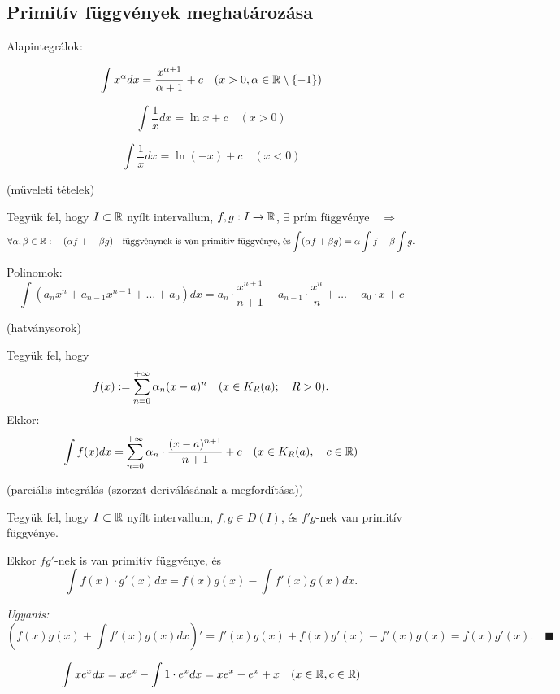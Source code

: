 \documentclass[a4paper,11.5pt]{article}
\begin{document}
	\subsection{Primitív függvények meghatározása}
	Alapintegrálok:
	\begin{example}
		\[ \int x^\alpha dx=\frac{x^{\alpha+1}}{\alpha+1}+c\quad (x>0, \alpha\in\mathbb{R}\setminus\{-1\}) \]
	\end{example}
	\begin{example}
		\[ \int \frac{1}{x} dx=\ln x +c\quad (x>0) \]
	\end{example}
	\begin{example}
		\[ \int \frac{1}{x} dx=\ln (-x) +c\quad (x<0) \]
	\end{example}
	\begin{theorem}
		(műveleti tételek)
		
		Tegyük fel, hogy $I\subset\mathbb{R}$ nyílt intervallum, $f,g:I\to\mathbb{R}$, $\exists$ prím függvénye$\quad \Rightarrow\quad$
		\[ \forall\alpha,\beta\in\mathbb{R}:\quad (\alpha f +\quad \beta g)\quad \text{függvénynek is van primitív függvénye, és}  \int(\alpha f +\beta g)=\alpha\int f+\beta \int g. \]
	\end{theorem}
	\begin{example}
		Polinomok:
		\[ \int(a_nx^n+a_{n-1}x^{n-1}+\ldots+a_0)dx=a_n\cdot
		\frac{x^{n+1}}{n+1}+a_{n-1}\cdot\frac{x^n}{n}+\ldots+a_0\cdot x+c \]
	\end{example}
	\begin{theorem}
		(hatványsorok)
		
		Tegyük fel, hogy 
		\[ f(x):=\displaystyle\sum_{n=0}^{+\infty}\alpha_n(x-a)^n\quad (x\in K_R(a);\quad R>0). \]
		Ekkor:
		\[ \int f(x)dx = \displaystyle\sum_{n=0}^{+\infty} \alpha_n\cdot\frac{(x-a)^{n+1}}{n+1}+c\quad (x\in K_R(a),\quad c\in\mathbb{R}) \]
	\end{theorem}
	\begin{theorem}
		(parciális integrálás (szorzat deriválásának a megfordítása))
		
		Tegyük fel, hogy $I\subset\mathbb{R}$ nyílt intervallum, $f,g\in D(I)$, és $f'g$-nek van primitív függvénye. 
		
		Ekkor $fg'$-nek is van primitív függvénye, és 
		\[ \int f(x)\cdot g'(x)dx=f(x)g(x)-\int f'(x)g(x)dx. \]
		
		\textit{Ugyanis:}
		\[ \left(f(x)g(x)+\int f'(x)g(x)dx \right)'=f'(x)g(x)+f(x)g'(x)-f'(x)g(x) = f(x)g'(x).\quad \blacksquare \]
	\end{theorem}
	\begin{example}
		\[ \int x e^x dx=xe^x-\int 1\cdot e^xdx=xe^x-e^x+x\quad (x\in\mathbb{R},c\in\mathbb{R}) \]
	\end{example}
\end{document}
